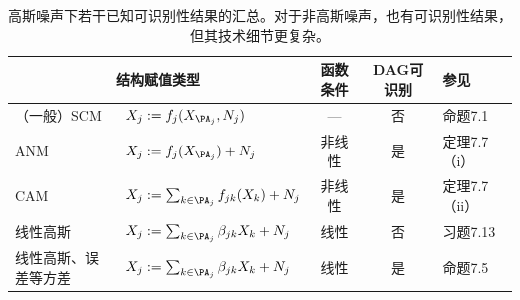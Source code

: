 \begin{table}[htbp]
\centering
\small
\setlength{\tabcolsep}{4pt}
\begin{tabular}{@{}llccl@{}}
\toprule
\multicolumn{2}{c}{结构赋值类型}&函数条件&DAG可识别&参见\\
\midrule
（一般）SCM&$X_j:=f_j(X_{\PA_j},N_j)$&—&否&命题7.1\\
ANM&$X_j:=f_j(X_{\PA_j})+N_j$&非线性&是&定理7.7（i）\\
CAM&$X_j:=\sum_{k\in\PA_j}f_{jk}(X_k)+N_j$&非线性&是&定理7.7（ii）\\
线性高斯&$X_j:=\sum_{k\in\PA_j}\beta_{jk}X_k+N_j$&线性&否&习题7.13\\
线性高斯、误差等方差&$X_j:=\sum_{k\in\PA_j}\beta_{jk}X_k+N_j$&线性&是&命题7.5\\
\bottomrule
\end{tabular}
\caption{高斯噪声下若干已知可识别性结果的汇总。对于非高斯噪声，也有可识别性结果，但其技术细节更复杂。}
\label{tab:ch07-identifiability}
\end{table}
